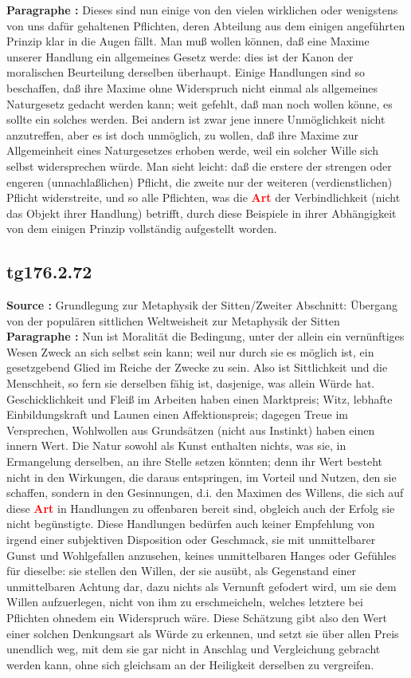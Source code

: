 \documentclass[a4paper,12pt,twoside]{book}
\newcommand{\match}[1]{\textcolor{red}{\textbf{#1}}}
\begin{document}
	\noindent\textbf{Paragraphe : }Dieses sind nun einige von den vielen wirklichen oder wenigstens von uns dafür gehaltenen Pflichten, deren Abteilung aus dem einigen angeführten Prinzip klar in die Augen fällt. Man muß wollen können, daß eine Maxime unserer Handlung ein allgemeines Gesetz werde: dies ist der Kanon der moralischen Beurteilung derselben überhaupt. Einige Handlungen sind so beschaffen, daß ihre Maxime ohne Widerspruch nicht einmal als allgemeines Naturgesetz 
	gedacht werden kann; weit gefehlt, daß man noch wollen könne, es sollte ein solches werden. Bei andern ist zwar jene innere Unmöglichkeit nicht anzutreffen, aber es ist doch unmöglich, zu wollen, daß ihre Maxime zur Allgemeinheit eines Naturgesetzes erhoben werde, weil ein solcher Wille sich selbst widersprechen würde. Man sieht leicht: daß die erstere der strengen oder engeren (unnachlaßlichen) Pflicht, die zweite nur der weiteren (verdienstlichen) Pflicht widerstreite, und so alle Pflichten, was die \match{Art} der Verbindlichkeit (nicht das Objekt ihrer Handlung) betrifft, durch diese Beispiele in ihrer Abhängigkeit von dem einigen Prinzip vollständig aufgestellt worden. 
	
	\subsection*{tg176.2.72} 
	\textbf{Source : }Grundlegung zur Metaphysik der Sitten/Zweiter Abschnitt: Übergang von der populären sittlichen Weltweisheit zur Metaphysik der Sitten\\  
	
	\noindent\textbf{Paragraphe : }Nun ist Moralität die Bedingung, unter der allein ein vernünftiges Wesen Zweck an sich selbst sein kann; weil nur durch sie es möglich ist, ein gesetzgebend Glied im Reiche der Zwecke zu sein. Also ist Sittlichkeit und die Menschheit, so fern sie derselben fähig ist, dasjenige, was allein Würde hat. Geschicklichkeit und Fleiß im Arbeiten haben einen Marktpreis; Witz, lebhafte Einbildungskraft und Launen einen Affektionspreis; dagegen Treue im Versprechen, Wohlwollen aus Grundsätzen (nicht aus Instinkt) haben einen innern Wert. Die Natur sowohl als Kunst enthalten nichts, was sie, in Ermangelung derselben, an ihre Stelle setzen könnten; denn ihr Wert besteht nicht in den Wirkungen, die daraus entspringen, im Vorteil und Nutzen, den sie schaffen, sondern in den Gesinnungen, d.i. den Maximen des Willens, die sich auf diese \match{Art} in Handlungen zu offenbaren bereit sind, obgleich auch der Erfolg sie nicht begünstigte. Diese Handlungen bedürfen auch keiner Empfehlung von irgend einer subjektiven Disposition oder Geschmack, sie mit unmittelbarer Gunst und Wohlgefallen anzusehen, keines unmittelbaren Hanges oder Gefühles für dieselbe: sie stellen den Willen, der sie ausübt, als Gegenstand einer unmittelbaren Achtung dar, dazu nichts als Vernunft gefodert wird, um sie dem Willen aufzuerlegen, nicht von  ihm zu erschmeicheln, welches letztere bei Pflichten ohnedem ein Widerspruch wäre. Diese Schätzung gibt also den Wert einer solchen Denkungsart als Würde zu erkennen, und setzt sie über allen Preis unendlich weg, mit dem sie gar nicht in Anschlag und Vergleichung gebracht werden kann, ohne sich gleichsam an der Heiligkeit derselben zu vergreifen. 
	
\end{document}
